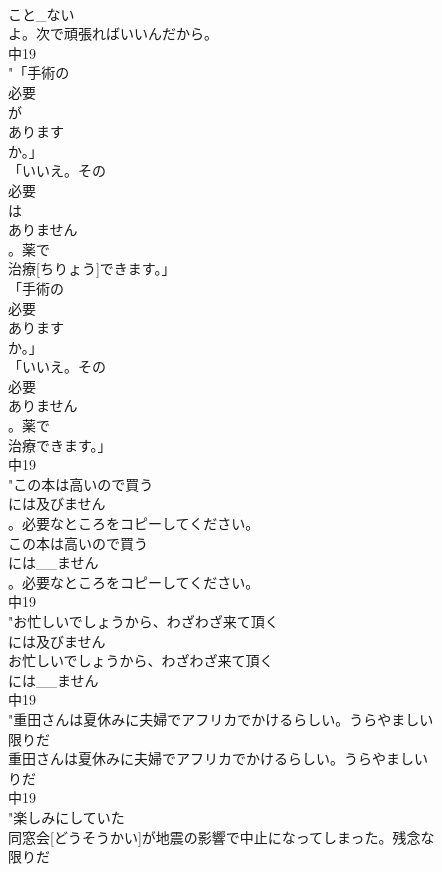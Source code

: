 \documentclass[8pt]{extreport}
\begin{document}
\begin{CJK}{UTF8}{min}
\\	こと_ない
\\	よ。次で頑張ればいいんだから。
\\	中19
\\	"「手術の
\\	必要
\\	が
\\	あります
\\	か。」
\\	「いいえ。その
\\	必要
\\	は
\\	ありません
\\	。薬で
\\	治療[ちりょう]できます。」
\\	「手術の
\\	必要
\\	あります
\\	か。」
\\	「いいえ。その
\\	必要
\\	ありません
\\	。薬で
\\	治療できます。」
\\	中19
\\	"この本は高いので買う
\\	には及びません
\\	。必要なところをコピーしてください。
\\	この本は高いので買う
\\	には__ません
\\	。必要なところをコピーしてください。
\\	中19
\\	"お忙しいでしょうから、わざわざ来て頂く
\\	には及びません
\\	お忙しいでしょうから、わざわざ来て頂く
\\	には__ません
\\	中19
\\	"重田さんは夏休みに夫婦でアフリカでかけるらしい。うらやましい
\\	限りだ
\\	重田さんは夏休みに夫婦でアフリカでかけるらしい。うらやましい
\\	りだ
\\	中19
\\	"楽しみにしていた
\\	同窓会[どうそうかい]が地震の影響で中止になってしまった。残念な
\\	限りだ

\end{CJK}
\end{document}

